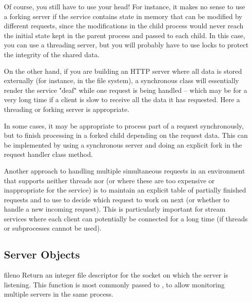 Of course, you still have to use your head!  For instance, it makes no sense
to use a forking server if the service contains state in memory that can be
modified by different requests, since the modifications in the child process
would never reach the initial state kept in the parent process and passed to
each child.  In this case, you can use a threading server, but you will
probably have to use locks to protect the integrity of the shared data.

On the other hand, if you are building an HTTP server where all data is
stored externally (for instance, in the file system), a synchronous class
will essentially render the service "deaf" while one request is being
handled -- which may be for a very long time if a client is slow to receive
all the data it has requested.  Here a threading or forking server is
appropriate.

In some cases, it may be appropriate to process part of a request
synchronously, but to finish processing in a forked child depending on the
request data.  This can be implemented by using a synchronous server and
doing an explicit fork in the request handler class 
method.

Another approach to handling multiple simultaneous requests in an
environment that supports neither threads nor  (or where
these are too expensive or inappropriate for the service) is to maintain an
explicit table of partially finished requests and to use 
to decide which request to work on next (or whether to handle a new incoming
request).  This is particularly important for stream services where each
client can potentially be connected for a long time (if threads or
subprocesses cannot be used).


\subsection{Server Objects}

\begin{funcdesc}{fileno}{}
Return an integer file descriptor for the socket on which the server
is listening.  This function is most commonly passed to
, to allow monitoring multiple servers in the
same process.
\end{funcdesc}

